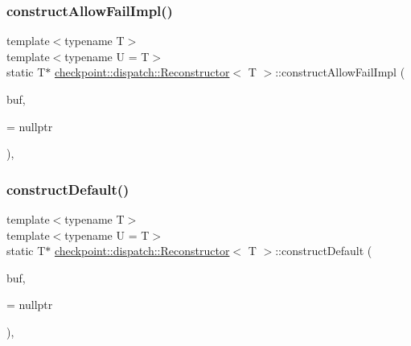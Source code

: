 \subsubsection{\texorpdfstring{construct\+Allow\+Fail\+Impl()}{constructAllowFailImpl()}\hspace{0.1cm}{\footnotesize\ttfamily [2/2]}}
{\footnotesize\ttfamily template$<$typename T$>$ \\
template$<$typename U  = T$>$ \\
static T$\ast$ \hyperlink{structcheckpoint_1_1dispatch_1_1_reconstructor}{checkpoint\+::dispatch\+::\+Reconstructor}$<$ T $>$\+::construct\+Allow\+Fail\+Impl (\begin{DoxyParamCaption}\item[{void $\ast$}]{buf,  }\item[{\hyperlink{namespacecheckpoint_a14b3c81988a2c2d3c935edcc653b6322}{is\+Not\+Constructible}$<$ U $>$ $\ast$}]{ = {\ttfamily nullptr} }\end{DoxyParamCaption})\hspace{0.3cm}{\ttfamily [inline]}, {\ttfamily [static]}}

\mbox{\label{structcheckpoint_1_1dispatch_1_1_reconstructor_af09a6d0312dbed7c8a311350b689794d}} 
\subsubsection{\texorpdfstring{construct\+Default()}{constructDefault()}\hspace{0.1cm}{\footnotesize\ttfamily [1/2]}}
{\footnotesize\ttfamily template$<$typename T$>$ \\
template$<$typename U  = T$>$ \\
static T$\ast$ \hyperlink{structcheckpoint_1_1dispatch_1_1_reconstructor}{checkpoint\+::dispatch\+::\+Reconstructor}$<$ T $>$\+::construct\+Default (\begin{DoxyParamCaption}\item[{void $\ast$}]{buf,  }\item[{\hyperlink{namespacecheckpoint_a58224a3b056d9e2aa73d563871981a7d}{is\+Default\+Cons\+Type}$<$ U $>$ $\ast$}]{ = {\ttfamily nullptr} }\end{DoxyParamCaption})\hspace{0.3cm}{\ttfamily [inline]}, {\ttfamily [static]}}

